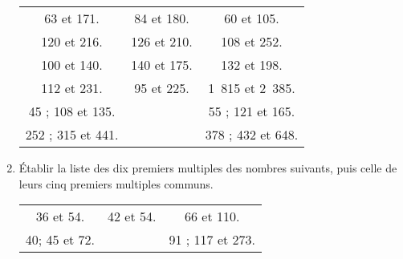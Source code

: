 \begin{enumerate}
\begin{center}\begin{tabular}{ccc}
63 et 171. & 84 et 180. & 60 et 105.\\
120 et 216. & 126 et 210. & 108 et 252. \\ 
100 et 140. & 140 et 175. & 132 et 198. \\
112 et 231. & 95 et 225. & 1~815 et 2~385. \\
45 ; 108 et 135. &  & 55 ; 121 et 165.\\
252 ; 315 et 441. & & 378 ; 432 et 648. 
\end{tabular} \end{center}

\item Établir la liste des dix premiers multiples des
nombres suivants, puis celle de leurs cinq premiers
multiples communs. 
\begin{center}\begin{tabular}{ccc} 
36 et 54. & 42 et 54. & 66 et 110. \\
40; 45 et 72. & & 91 ; 117 et 273.\end{tabular}
\end{center}
\end{enumerate}
